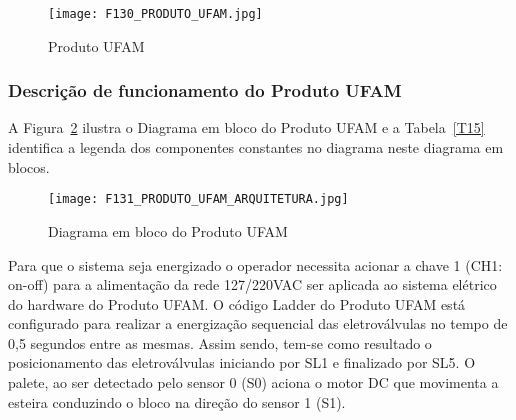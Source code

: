 	 
\begin{figure}
	\centering
	\texttt{[image: F130\_PRODUTO\_UFAM.jpg]} 
	\caption{Produto UFAM}
	\label{F130}
\end{figure}
	 
	 
\subsubsection{Descrição de funcionamento do Produto UFAM}

A Figura~\ref{F131} ilustra o Diagrama em bloco do Produto UFAM e a Tabela~\ref{T15} identifica a legenda dos componentes constantes no diagrama neste diagrama em blocos.

\begin{figure}
 	\centering
 	\texttt{[image: F131\_PRODUTO\_UFAM\_ARQUITETURA.jpg]} 
 	\caption{Diagrama em bloco do Produto UFAM}
 	\label{F131}
\end{figure}   	
 
Para que o sistema seja energizado o operador necessita acionar a chave 1 (CH1: on-off) para a alimentação da rede 127/220VAC ser aplicada ao sistema elétrico do hardware do Produto UFAM. O código Ladder do Produto UFAM está configurado para realizar a energização sequencial das eletroválvulas no tempo de 0,5 segundos entre as mesmas. Assim sendo, tem-se como resultado o posicionamento das eletroválvulas iniciando por SL1 e finalizado por SL5. O palete, ao ser detectado pelo sensor 0 (S0) aciona o motor DC que movimenta a esteira conduzindo o bloco na direção do sensor 1 (S1). 
	 
